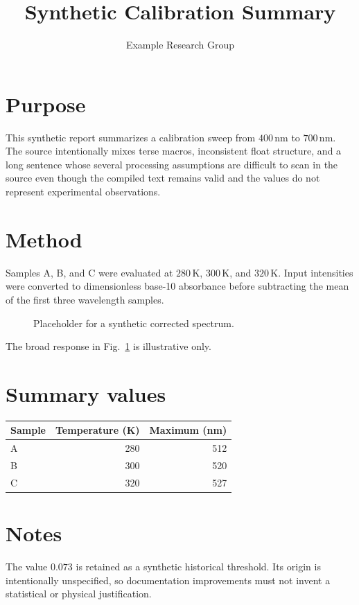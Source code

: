 \documentclass[10pt]{article}
\title{Synthetic Calibration Summary}
\author{Example Research Group}
\date{}
\newcommand{\unitnm}{\,\mathrm{nm}}
\newcommand{\unitkelvin}{\,\mathrm{K}}
\newcommand{\sample}[1]{\textsf{#1}}
\newlength{\plotwidth}
\begin{document}
\maketitle

\section{Purpose}

This synthetic report summarizes a calibration sweep from $400\unitnm$ to $700\unitnm$. The source intentionally mixes terse macros, inconsistent float structure, and a long sentence whose several processing assumptions are difficult to scan in the source even though the compiled text remains valid and the values do not represent experimental observations.

\section{Method}

Samples \sample{A}, \sample{B}, and \sample{C} were evaluated at $280\unitkelvin$, $300\unitkelvin$, and $320\unitkelvin$. Input intensities were converted to dimensionless base-10 absorbance before subtracting the mean of the first three wavelength samples.

\begin{figure}[htbp]
\centering
{}
\caption{Placeholder for a synthetic corrected spectrum.}
\label{fig:spectrum}
\end{figure}

The broad response in Fig.~\ref{fig:spectrum} is illustrative only.

\section{Summary values}

\begin{center}
\begin{tabular}{lrr}
\toprule
Sample & Temperature (K) & Maximum (nm) \\
\midrule
\sample{A} & 280 & 512 \\
\sample{B} & 300 & 520 \\
\sample{C} & 320 & 527 \\
\bottomrule
\end{tabular}
\end{center}

\section{Notes}

\begin{minipage}{0.94\linewidth}
The value $0.073$ is retained as a synthetic historical threshold. Its origin is intentionally unspecified, so documentation improvements must not invent a statistical or physical justification.
\end{minipage}
\end{document}
